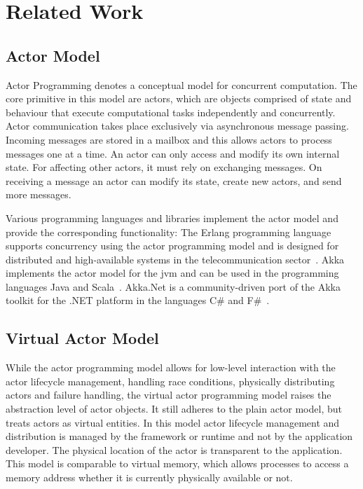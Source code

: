 
\section{Related Work}

  \subsection{Actor Model}
  Actor Programming denotes a conceptual model for concurrent computation.
  The core primitive in this model are actors, which are objects comprised of state and behaviour that execute computational tasks independently and concurrently.
  Actor communication takes place exclusively via asynchronous message passing.
  Incoming messages are stored in a mailbox and this allows actors to process messages one at a time.
  An actor can only access and modify its own internal state.
  For affecting other actors, it must rely on exchanging messages.
  On receiving a message an actor can modify its state, create new actors, and send more messages.

  Various programming languages and libraries implement the actor model and provide the corresponding functionality:
  The Erlang programming language supports concurrency using the actor programming model and is designed for distributed and high-available systems in the telecommunication sector~\cite{armstrong:erlang}.
  Akka implements the actor model for the \gls{jvm} and can be used in the programming languages Java and Scala~\cite{akka}.
  Akka.Net is a community-driven port of the Akka toolkit for the .NET platform in the languages C\# and F\#~\cite{akka.net}.

  \subsection{Virtual Actor Model}
  While the actor programming model allows for low-level interaction with the actor lifecycle management, handling race conditions, physically distributing actors and failure handling, the virtual actor programming model raises the abstraction level of actor objects.
  It still adheres to the plain actor model, but treats actors as virtual entities.
  In this model actor lifecycle management and distribution is managed by the framework or runtime and not by the application developer.
  The physical location of the actor is transparent to the application.
  This model is comparable to virtual memory, which allows processes to access a memory address whether it is currently physically available or not.


